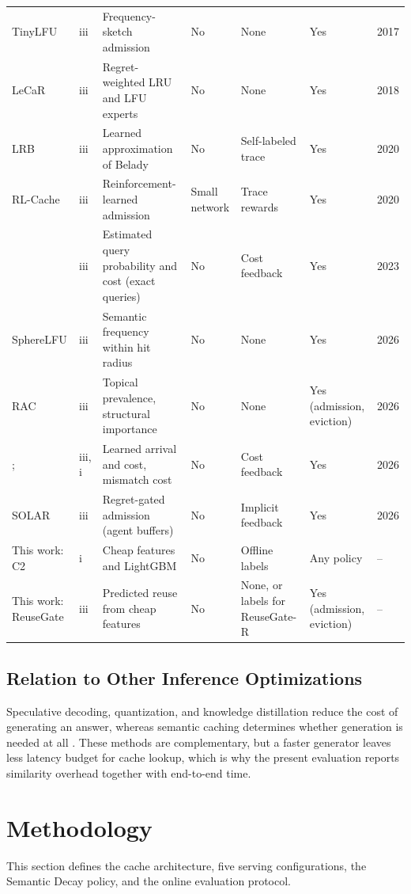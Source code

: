 \documentclass[authoryear,preprint,review,12pt]{elsarticle}
\begin{document}
\begin{table}[htbp]
{\begin{tabular}{lllllll}
TinyLFU \citep{einziger2017tinylfu} & iii & Frequency-sketch admission & No & None & Yes & 2017 \\
LeCaR \citep{vietri2018lecar} & iii & Regret-weighted LRU and LFU experts & No & None & Yes & 2018 \\
LRB \citep{song2020lrb} & iii & Learned approximation of Belady & No & Self-labeled trace & Yes & 2020 \\
RL-Cache \citep{kirilin2020rlcache} & iii & Reinforcement-learned admission & Small network & Trace rewards & Yes & 2020 \\
\citet{zhu2023optimal} & iii & Estimated query probability and cost (exact queries) & No & Cost feedback & Yes & 2023 \\
SphereLFU \citep{biton2026spherelfu} & iii & Semantic frequency within hit radius & No & None & Yes & 2026 \\
RAC \citep{wu2026rac} & iii & Topical prevalence, structural importance & No & None & Yes (admission, eviction) & 2026 \\
\citet{liu2025semantic}; \citet{atalar2026continuous} & iii, i & Learned arrival and cost, mismatch cost & No & Cost feedback & Yes & 2026 \\
SOLAR \citep{sun2026solar} & iii & Regret-gated admission (agent buffers) & No & Implicit feedback & Yes & 2026 \\
\midrule
This work: C2 & i & Cheap features and LightGBM & No & Offline labels & Any policy & -- \\
This work: ReuseGate & iii & Predicted reuse from cheap features & No & None, or labels for ReuseGate-R & Yes (admission, eviction) & -- \\
\bottomrule
\end{tabular}}
\end{table}

\subsection{Relation to Other Inference Optimizations}
Speculative decoding, quantization, and knowledge distillation reduce the cost of generating an answer, whereas semantic caching determines whether generation is needed at all \citep{Bhattacharjee2024Speculative,Esser2025SiLQ,Cao2025DeltaKD}. These methods are complementary, but a faster generator leaves less latency budget for cache lookup, which is why the present evaluation reports similarity overhead together with end-to-end time.

\section{Methodology}
\label{sec:methodology}
This section defines the cache architecture, five serving configurations, the Semantic Decay policy, and the online evaluation protocol.
\end{document}
